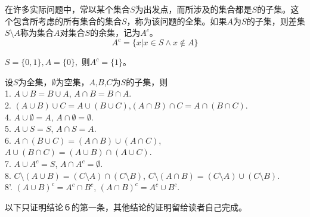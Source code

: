 {\flushleft
\begin{minipage}{0.70\linewidth}
  \begin{Def}
    在许多实际问题中，常以某个集合$S$为出发点，而所涉及的集合都是$S$的子集。这个包含所考虑的所有集合的集合$S$，称为该问题的全集。如果$A$为$S$的子集，则差集$S \setminus A$称为集合$A$对集合$S$的余集，记为$A^c$。
    \begin{equation*}
      A^c = \{x|x \in S \land x \notin A\}
    \end{equation*}
  \end{Def}
\end{minipage}
\begin{minipage}{0.29\linewidth}
\end{minipage}
}
    \begin{Example}
        $S = \{0,1\}, A =  \{0\},$ 则$A^c = \{1\}$。
    \end{Example}

\begin{Thm}
设$S$为全集，$\emptyset$为空集，$A$,$B$,$C$为$S$的子集，则\\
1. $A \cup B = B \cup A$, $A \cap B = B \cap A$.\\
2. $(A \cup B) \cup C = A \cup (B \cup C)$,$(A \cap B) \cap C = A \cap (B \cap C)$.\\
4. $A \cup \emptyset = A$, $A \cap \emptyset = \emptyset$.\\
5. $A \cup S = S$, $A \cap S = A$.\\
6. $A \cap (B \cup C) = (A \cap B) \cup (A \cap C)$, $A \cup (B \cap C) = (A \cup B) \cap (A \cup C)$.\\
7. $A \cup A^c = S$, $A \cap A^c = \emptyset$.\\
8. $C\setminus (A \cup B) = (C \setminus A) \cap (C \setminus B)$, $C \setminus (A \cap B) = (C \setminus A) \cup (C \setminus B)$.\\ 
8'. $(A \cup B)^c = A^c \cap B^c$, $(A \cap B)^c = A^c \cup B^c$.\\
\end{Thm}
  以下只证明结论６的第一条，其他结论的证明留给读者自己完成。

